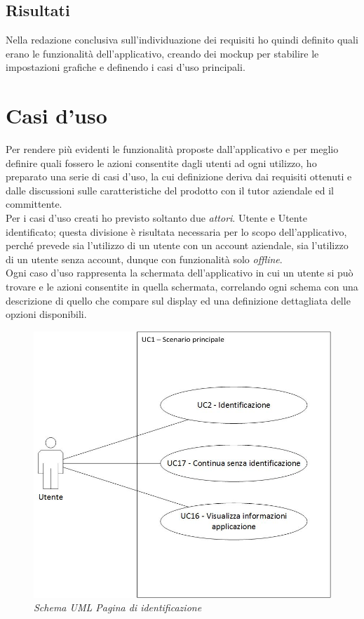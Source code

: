 \subsection{Risultati}
Nella redazione conclusiva sull'individuazione dei requisiti ho quindi definito quali erano le funzionalità dell'applicativo, creando dei mockup per stabilire le impostazioni grafiche e definendo i casi d'uso principali.
\section{Casi d'uso}
Per rendere più evidenti le funzionalità proposte dall'applicativo e per meglio definire quali fossero le azioni consentite dagli utenti ad ogni utilizzo, ho preparato una serie di casi d'uso, la cui definizione deriva dai requisiti ottenuti e dalle discussioni sulle caratteristiche del prodotto con il tutor aziendale ed il committente. \\
Per i casi d'uso creati ho previsto soltanto due \textit{attori}. Utente e Utente identificato; questa divisione è risultata necessaria per lo scopo dell'applicativo, perché prevede sia l'utilizzo di un utente con un account aziendale, sia l'utilizzo di un utente senza account, dunque con funzionalità solo \textit{offline}. \\
Ogni caso d'uso rappresenta la schermata dell'applicativo in cui un utente si può trovare e le azioni consentite in quella schermata, correlando ogni schema con una descrizione di quello che compare sul display ed una definizione dettagliata delle opzioni disponibili.
\begin{figure}[ht]
	\centering
	\includegraphics[scale=0.35]{immagini/analisi/UC01_scenario_principale.jpg}
	\caption{\textit{Schema UML Pagina di identificazione}}
\end{figure}\FloatBarrier

